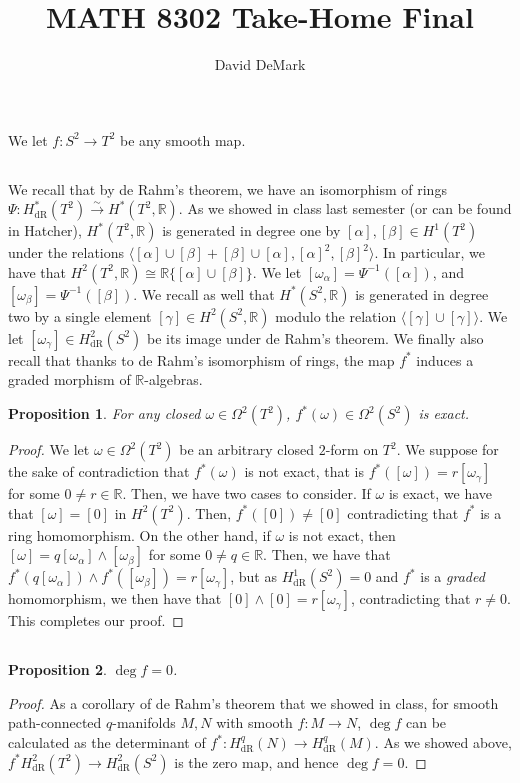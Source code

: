 \documentclass[english]{article}
\title{MATH 8302 Take-Home Final}
\author{David DeMark}
\date{\due}
\newcommand{\RR}{\mathbb{R}}
\newcommand{\prob}[1]{\setcounter{section}{#1-1}\section{}}
\newcommand{\prt}[1]{\setcounter{subsection}{#1-1}\subsection{}}
\newtheorem*{proposition*}{Proposition}
\theoremstyle{remark}
\theoremstyle{definition}
\newcommand{\idl}[1]{\langle #1\rangle}
\newcommand{\hdr}{H_{\mathrm{dR}}}
\newcommand{\tosm}{\xrightarrow{\sim}}
\begin{document}
\maketitle
\prob{1} We let $f:S^2\to T^2$ be any smooth map.
\prt{1}
We recall that by de Rahm's theorem, we have an isomorphism of rings $\Psi:\hdr^*(T^2)\tosm H^*(T^2,\RR)$. As we showed in class last semester (or can be found in Hatcher), $H^*(T^2, \RR)$  is generated in degree one by $[\alpha],[\beta]\in H^1(T^2)$ under the relations $\idl{[\alpha]\cup[\beta]+[\beta]\cup[\alpha],[\alpha]^2,[\beta]^2}$. In particular, we have that $H^2(T^2,\RR)\cong \RR\{[\alpha]\cup [\beta]\}$. We let $[\omega_\alpha]=\Psi^{-1}([\alpha])$, and $[\omega_\beta]=\Psi^{-1}([\beta])$. We recall as well that $H^*(S^2,\RR)$ is generated in degree two by a single element $[\gamma]\in H^2(S^2,\RR)$ modulo the relation $\idl{[\gamma]\cup [\gamma]}$. We let $[\omega_\gamma]\in \hdr^2(S^2)$ be its image under de Rahm's theorem. We finally also recall that thanks to de Rahm's isomorphism of rings, the map $f^*$ induces a graded morphism of $\RR$-algebras.
\begin{proposition*}
	For any closed $\omega\in \Omega^2(T^2)$, $f^*(\omega)\in \Omega^2(S^2)$ is exact.
\end{proposition*}
\begin{proof}
We let $\omega\in \Omega^2(T^2)$ be an arbitrary closed $2$-form on $T^2$. We suppose for the sake of contradiction that $f^*(\omega)$ is not exact, that is $f^*([\omega])=r[\omega_\gamma]$ for some $0\neq r\in \RR$. Then, we have two cases to consider. If $\omega$ is exact, we have that $[\omega]=[0]$ in $H^2(T^2)$. Then, $f^*([0])\neq [0]$ contradicting that $f^*$ is a ring homomorphism. On the other hand, if $\omega$ is not exact, then $[\omega]=q[\omega_\alpha]\wedge [\omega_\beta]$ for some $0\neq q \in \RR$. Then, we have that $f^*(q[\omega_\alpha])\wedge f^*([\omega_\beta])=r[\omega_\gamma]$, but as $\hdr^1(S^2)=0$ and $f^*$ is a \emph{graded} homomorphism, we then have that $[0]\wedge [0]=r[\omega_\gamma]$, contradicting that $r\neq 0$. This completes our proof.
\end{proof}
\prt{2}
\begin{proposition*}
	$\deg f=0$. 
\end{proposition*}
\begin{proof}
	As a corollary of de Rahm's theorem that we showed in class, for smooth path-connected $q$-manifolds $M,N$ with smooth $f:M\to N$, $\deg f$ can be calculated as the determinant of $f^*:\hdr^q(N)\to \hdr^q(M)$. As we showed above, $f^*\hdr^2(T^2)\to \hdr^2(S^2)$ is the zero map, and hence $\deg f=0$. 
\end{proof}
\end{document}
